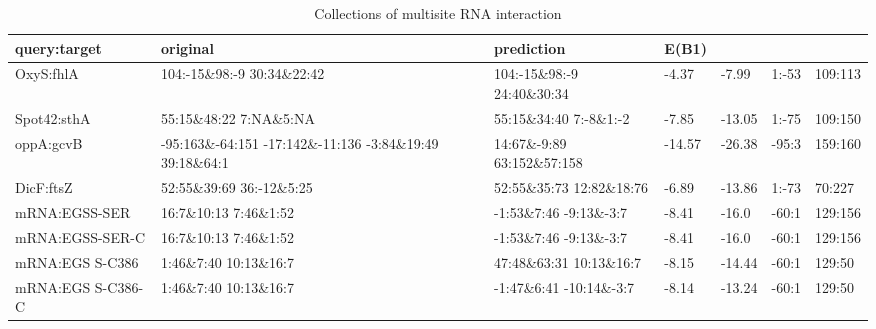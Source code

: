 \documentclass[twoside,a4paper]{report}
\begin{document}
\begin{table}[H]
	
	\label{Table:2}
	\begin{tabular}{ |p{2cm}|p{2.8cm}|p{2.8cm}|p{1cm}|p{1cm}|p{1cm}|p{1cm}|}
	
		\hline
		query:target& original& prediction& \rotatebox[origin=c]{90} {E(B1)}  &\rotatebox[origin=c]{90}{E(B1+B2)}  &\rotatebox[origin=c]{90}{1st index}  &\rotatebox[origin=c]{90}{length} \\
		\hline
		\hline
		OxyS:fhlA&104:-15\&98:-9 30:34\&22:42
		&104:-15\&98:-9 24:40\&30:34&-4.37 &-7.99 &1:-53&109:113\\
		\hline
		Spot42:sthA&55:15\&48:22  7:NA\&5:NA & 55:15\&34:40 7:-8\&1:-2
		& -7.85 &-13.05 & 1:-75 &109:150 \\
		\hline
		oppA:gcvB &-95:163\&-64:151 -17:142\&-11:136 -3:84\&19:49 39:18\&64:1  &14:67\&-9:89 63:152\&57:158
		
		& -14.57 &-26.38 & -95:3 &159:160\\
		\hline
		DicF:ftsZ&52:55\&39:69   \hbox{36:-12\&5:25}  &52:55\&35:73 12:82\&18:76	& -6.89 &-13.86 &1:-73 &70:227 \\
		\hline
		mRNA:EGSS-SER &16:7\&10:13 7:46\&1:52
		  &-1:53\&7:46 \hbox{-9:13\&-3:7}
		 & -8.41 &-16.0 & -60:1 &129:156 \\
		\hline
		mRNA:EGSS-SER-C &16:7\&10:13 7:46\&1:52
		  &-1:53\&7:46 \hbox{-9:13\&-3:7}
		 & -8.41 &-16.0 & -60:1 &129:156 \\
		\hline
		mRNA:EGS S-C386 &1:46\&7:40 10:13\&16:7 &
		47:48\&63:31 10:13\&16:7
		  & -8.15&-14.44 & -60:1 &129:50 \\
		\hline
		mRNA:EGS S-C386-C &1:46\&7:40 10:13\&16:7
		 &-1:47\&6:41 \hbox{-10:14\&-3:7}
		  & -8.14 &-13.24 & -60:1 &129:50 \\
		\hline
	\end{tabular}
	\caption{Collections of multisite RNA interaction }	
\end{table}
\end{document}
